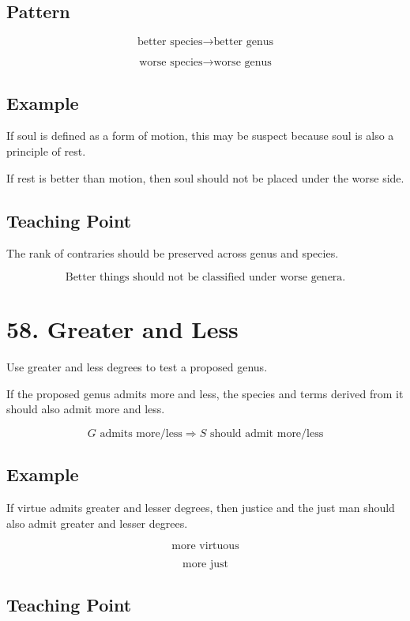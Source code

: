 \documentclass[12pt]{article}
\begin{document}
\subsection*{Pattern}

\[
\text{better species} \rightarrow \text{better genus}
\]

\[
\text{worse species} \rightarrow \text{worse genus}
\]

\subsection*{Example}

If soul is defined as a form of motion, this may be suspect because soul is also
a principle of rest.

If rest is better than motion, then soul should not be placed under the worse
side.

\subsection*{Teaching Point}

The rank of contraries should be preserved across genus and species.

\[
\boxed{
\text{Better things should not be classified under worse genera.}
}
\]

\section*{58. Greater and Less}

Use greater and less degrees to test a proposed genus.

If the proposed genus admits more and less, the species and terms derived from
it should also admit more and less.

\[
G \text{ admits more/less}
\Rightarrow
S \text{ should admit more/less}
\]

\subsection*{Example}

If virtue admits greater and lesser degrees, then justice and the just man
should also admit greater and lesser degrees.

\[
\text{more virtuous}
\]

\[
\text{more just}
\]

\subsection*{Teaching Point}
\end{document}
